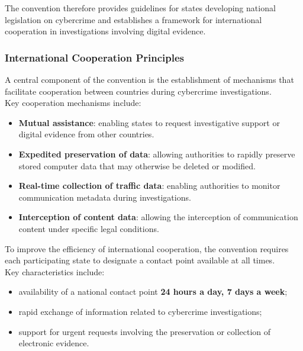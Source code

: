 \noindent
The convention therefore provides guidelines for states developing national legislation on cybercrime and establishes a framework for international cooperation in investigations involving digital evidence.


\subsubsection*{International Cooperation Principles}

A central component of the convention is the establishment of mechanisms that facilitate cooperation between countries during cybercrime investigations.\\
Key cooperation mechanisms include:

\begin{itemize}
    \item \textbf{Mutual assistance}: enabling states to request investigative support or digital evidence from other countries.

    \item \textbf{Expedited preservation of data}: allowing authorities to rapidly preserve stored computer data that may otherwise be deleted or modified.

    \item \textbf{Real-time collection of traffic data}: enabling authorities to monitor communication metadata during investigations.

    \item \textbf{Interception of content data}: allowing the interception of communication content under specific legal conditions.
\end{itemize}

\noindent
To improve the efficiency of international cooperation, the convention requires each participating state to designate a contact point available at all times.\\
Key characteristics include:

\begin{itemize}
    \item availability of a national contact point \textbf{24 hours a day, 7 days a week};

    \item rapid exchange of information related to cybercrime investigations;

    \item support for urgent requests involving the preservation or collection of electronic evidence.
\end{itemize}

